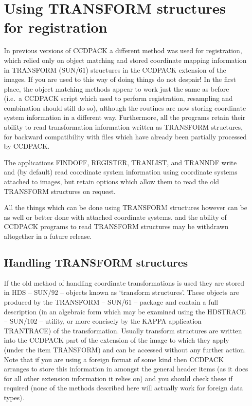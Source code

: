 \documentclass[twoside,11pt]{article}
\newcommand{\xref}[3]{#1}
\newcommand{\xlabel}[1]{}
\renewcommand{\_}{\texttt{\symbol{95}}}
\newcommand{\routine}[1]{{\sc #1}}
\begin{document}
\newpage
\section{\xlabel{transformregistration}\label{transformreg}Using 
         TRANSFORM structures for registration}

In previous versions of CCDPACK a different method was used
for registration, which relied only on object matching and
stored coordinate mapping information in 
\xref{TRANSFORM (SUN/61)}{sun61}{} structures in the CCDPACK
extension of the images. 
If you are used to this way of doing things do not despair!
In the first place,
the object matching methods appear to work just the same as
before (i.e.\ a CCDPACK script which used to perform registration,
resampling and combination should still do so),
although the routines are now storing coordinate 
system information in a different way.
Furthermore, all the programs retain their ability to read transformation
information written as TRANSFORM structures,
for backward compatibility
with files which have already been partially processed by CCDPACK.

The applications 
\routine{FINDOFF}, \routine{REGISTER}, \routine{TRANLIST}, and 
\routine{TRANNDF} 
write and (by default) read coordinate system
information using coordinate systems attached to images, but retain options
which allow them to read the old TRANSFORM structures on request.

All the things which can be done using TRANSFORM structures
however can be as well or better done with attached coordinate systems,
and the ability of CCDPACK programs
to read TRANSFORM structures may be
withdrawn altogether in a future release.


\subsection{\xlabel{handlingtransforms}Handling TRANSFORM structures
               \label{handling_transforms}}

If the old method of handling coordinate transformations is used
they are stored in \xref{HDS -- SUN/92 --}{sun92}{} objects known as
`transform structures'. These objects are produced by the
\xref{TRANSFORM -- SUN/61 --}{sun61}{} package and contain a full
description (in an algebraic form which may be examined using the
\xref{HDSTRACE -- SUN/102 --}{sun102}{} utility, or more concisely by
the \xref{KAPPA}{sun95}{} application
\xref{TRANTRACE}{sun95}{TRANTRACE}) of the transformation.  Usually
transform structures are written into the CCDPACK part of the
extension of the image to which they apply (under the item TRANSFORM)
and can be accessed without any further action. Note that if you
are using a foreign format of some kind then CCDPACK arranges
to store this information in amongst the general header items
(as it does for all other extension information it relies on)
and you should check these if required (none of the methods described
here will actually work for foreign data types).
\end{document}
